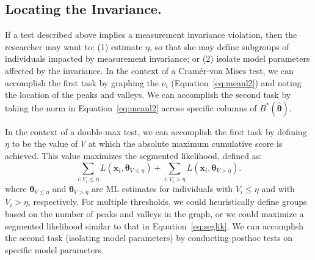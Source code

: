 \documentclass[man]{apa}
\begin{document}
\subsection{Locating the Invariance.}
If a test described above implies a measurement invariance violation,
then the researcher may want to: (1) estimate $\eta$, so that she may
define subgroups of individuals impacted by measurement invariance;
or (2) isolate model
parameters affected by the invariance.  
In the context of a Cram\'{e}r-von Mises test, we can accomplish the
first task by graphing the $\nu_i$ (Equation~\eqref{eq:meanl2})
and noting the location of the peaks and valleys.  We can accomplish
the second task by taking the norm in Equation~\eqref{eq:meanl2}
across specific columns of $B^{\ast}(\widehat{\bm \theta})$.

In the context of a double-max test, we can accomplish the first task
by defining $\eta$ to be the value
of $V$ at which the absolute
maximum cumulative score is achieved.  This value maximizes the
segmented likelihood, defined as:
\begin{equation}
    \label{eq:seglik}
    \sum_{i; V_i \leq \eta} L(\bm{x}_i, \bm{\theta}_{V \leq \eta}) + 
     \sum_{i; V_i > \eta} L(\bm{x}_i, \bm{\theta}_{V > \eta}).
\end{equation}
where $\bm{\theta}_{V \leq \eta}$ and $\bm{\theta}_{V > \eta}$ are ML estimates
for individuals with 
$V_i \leq \eta$ and with $V_i > \eta$, respectively.
  For multiple thresholds, we
could heuristically define groups based on the number of peaks and
valleys in the graph, or we could maximize a segmented likelihood
similar to that in Equation~\eqref{eq:seglik}.
We can accomplish the second task (isolating model parameters) by
conducting posthoc 
tests on specific model parameters.  
\end{document}
